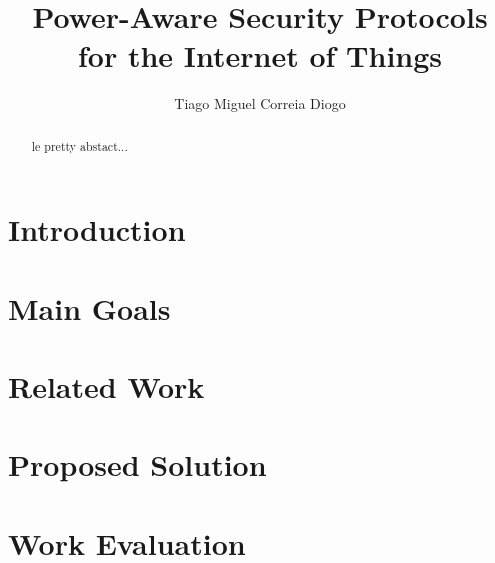 \documentclass{llncs}
\begin{document}
\title{Power-Aware Security Protocols\\ for the Internet of Things}
%
\titlerunning{}  %
%
\author{Tiago Miguel Correia Diogo}
%
%
%

\maketitle              %

\begin{abstract}
le pretty abstact...
\end{abstract}

\tableofcontents
\newpage

\section{Introduction}


\section{Main Goals}


\section{Related Work}


\section{Proposed Solution}


\section{Work Evaluation}

\end{document}
